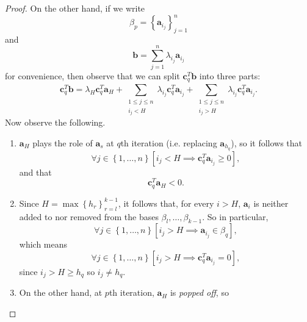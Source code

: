 \documentclass{article}
\renewcommand{\vec}{\mathbf}
\begin{document}
\begin{proof}
    On the other hand, if we write
    \begin{equation*}
        \beta_p = \left\lbrace \vec{a}_{i_j} \right\rbrace ^n_{j=1}
    \end{equation*}
    and
    \begin{equation*}
        \vec{b} = \sum^{n}_{j=1} \lambda_{i_j}\vec{a}_{i_j} 
    \end{equation*}
    for convenience, then observe that we can split $\vec{c}_q^{T} \vec{b}$ into three parts:
    \begin{equation}
        \vec{c}_q^{T}\vec{b}  = \lambda_H\vec{c}_q^{T} \vec{a}_H + \sum^{}_{\substack{1\leq j\leq n\\i_j<H}}\lambda_{i_j}\vec{c}_q^{T} \vec{a}_{i_j} + \sum^{}_{\substack{1\leq j\leq n\\i_j>H}} \lambda_{i_j}\vec{c}_q^{T} \vec{a}_{i_j}. 
    \end{equation}
    Now observe the following.
    \begin{enumerate}
        \item $\vec{a}_H$ plays the role of $\vec{a}_s$ at $q$th iteration (i.e. replacing $\vec{a}_{h_q}$), so it follows that 
            \begin{equation}
                \forall j\in\left\lbrace 1,\ldots,n \right\rbrace \left[ i_j < H \implies \vec{c}_q^{T} \vec{a}_{i_j}\geq 0 \right] ,
            \end{equation}
            and that
            \begin{equation}
                \vec{c}_q^{T} \vec{a}_H < 0.
            \end{equation}
        \item Since $H = \max\left\lbrace h_r \right\rbrace ^{k-1}_{r=l}$, it follows that, for every $i>H$, $\vec{a}_i$ is neither added to nor removed from the bases $\beta_l,\ldots,\beta_{k-1}$. So in particular,
            \begin{equation*}
                \forall j\in\left\lbrace 1,\ldots,n \right\rbrace \left[ i_j > H \implies \vec{a}_{i_j}\in \beta_q \right] ,
            \end{equation*}
            which means
            \begin{equation}
                \forall j\in\left\lbrace 1,\ldots,n \right\rbrace \left[ i_j > H \implies \vec{c}_q^{T} \vec{a}_{i_j} = 0 \right] ,
            \end{equation}
            since $i_j>H\geq h_q$ so $i_j\neq h_q$.
        \item On the other hand, at $p$th iteration, $\vec{a}_H$ is \textit{popped off}, so

\end{enumerate}
\end{proof}
\end{document}
